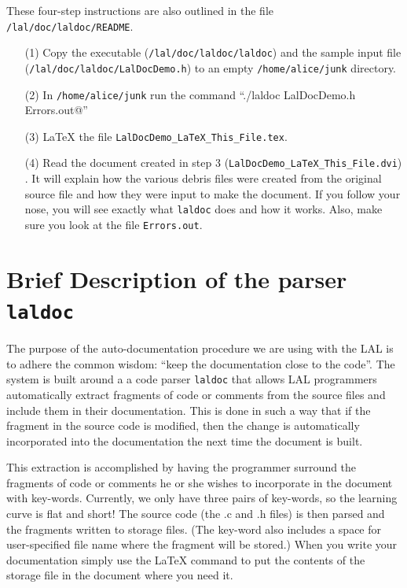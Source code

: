 \documentclass[oneside]{book}
\begin{document}
\noindent
These four-step instructions are also outlined in the file
{\tt /lal/doc/laldoc/README}.

\begin{itemize}
\item[(1)] Copy the executable ({\tt /lal/doc/laldoc/laldoc})
and the  sample input file ({\tt /lal/doc/laldoc/LalDocDemo.h}) to an
empty  {\tt /home/alice/junk} directory.
\item[(2)] In {\tt /home/alice/junk}
run the command ``\verb@./laldoc LalDocDemo.h Errors.out@''
\item[(3)] {\LaTeX} the file {\texttt {LalDocDemo\_LaTeX\_This\_File.tex}}.
\item[(4)] Read the  document created in step 3
({\texttt {LalDocDemo\_LaTeX\_This\_File.dvi}}) . It will explain how
the various debris files were created from the original source file
and how they were input to make the document.  If you follow your
nose,  you will see exactly what  {\texttt {laldoc}} does and how it
works.  Also, make sure you look at the file {\tt Errors.out}.
\end{itemize}

\section{Brief Description of the parser {\texttt {laldoc}} }

The purpose of the auto-documentation procedure we are using with the
LAL is to adhere the common wisdom: ``keep the documentation close to
the code''.  The system is built around a a code
parser {\tt laldoc} that allows LAL programmers automatically extract fragments of
code or comments from the source files and include them in their
documentation.  This is done in such a way that if the fragment in the
source code is modified, then the change is automatically incorporated
into the documentation the next time the document is built.

This extraction is  accomplished by having the programmer surround the
fragments of code or comments he or she wishes to incorporate in the
document with key-words.  Currently, we only have three pairs of
key-words, so the learning curve is flat and short! The source code
(the .c and .h files) is then parsed and the fragments written to
storage files.  (The key-word also includes a space for user-specified file name
where the fragment will be stored.)  When you write your documentation simply
use the {\LaTeX} command \verb@@ to put the contents of the
storage file in the document where you need it.
\end{document}

